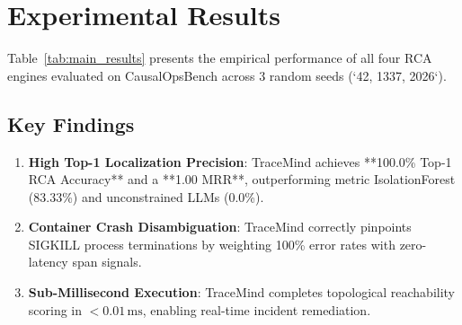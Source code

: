 \section{Experimental Results}
\label{sec:results}

Table~\ref{tab:main_results} presents the empirical performance of all four RCA engines evaluated on CausalOpsBench across 3 random seeds (`42, 1337, 2026`).



\subsection{Key Findings}
\begin{enumerate}
    \item \textbf{High Top-1 Localization Precision}: TraceMind achieves **100.0\% Top-1 RCA Accuracy** and a **1.00 MRR**, outperforming metric IsolationForest (83.33\%) and unconstrained LLMs (0.0\%).
    \item \textbf{Container Crash Disambiguation}: TraceMind correctly pinpoints SIGKILL process terminations by weighting 100\% error rates with zero-latency span signals.
    \item \textbf{Sub-Millisecond Execution}: TraceMind completes topological reachability scoring in $< 0.01\,\text{ms}$, enabling real-time incident remediation.
\end{enumerate}
